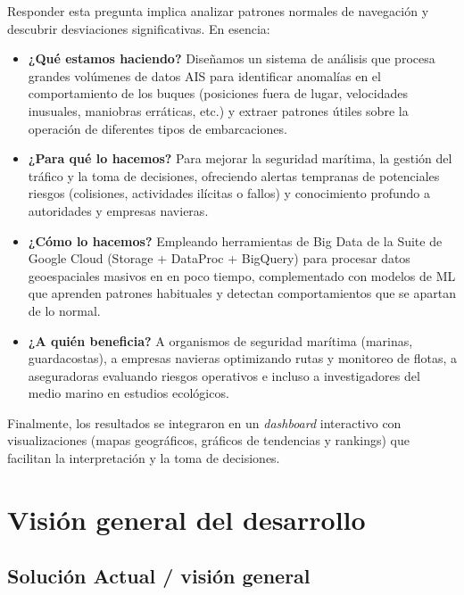 \documentclass[10pt]{article}
\begin{document}
Responder esta pregunta implica analizar patrones normales de navegación y descubrir desviaciones significativas. En esencia:
\begin{itemize}
    \item \textbf{¿Qué estamos haciendo?} Diseñamos un sistema de análisis que procesa grandes volúmenes de datos AIS para identificar anomalías en el comportamiento de los buques (posiciones fuera de lugar, velocidades inusuales, maniobras erráticas, etc.) y extraer patrones útiles sobre la operación de diferentes tipos de embarcaciones.
    \item \textbf{¿Para qué lo hacemos?} Para mejorar la seguridad marítima, la gestión del tráfico y la toma de decisiones, ofreciendo alertas tempranas de potenciales riesgos (colisiones, actividades ilícitas o fallos) y conocimiento profundo a autoridades y empresas navieras.
    \item \textbf{¿Cómo lo hacemos?} Empleando herramientas de Big Data de la Suite de Google Cloud (Storage + DataProc + BigQuery) para procesar datos geoespaciales masivos en en poco tiempo, complementado con modelos de ML que aprenden patrones habituales y detectan comportamientos que se apartan de lo normal.
    \item \textbf{¿A quién beneficia?} A organismos de seguridad marítima (marinas, guardacostas), a empresas navieras optimizando rutas y monitoreo de flotas, a aseguradoras evaluando riesgos operativos e incluso a investigadores del medio marino en estudios ecológicos.
\end{itemize}

Finalmente, los resultados se integraron en un \textit{dashboard} interactivo con visualizaciones (mapas geográficos, gráficos de tendencias y rankings) que facilitan la interpretación y la toma de decisiones.
\section{Visión general del desarrollo} 
\subsection{Solución Actual / visión general} %
\end{document}
